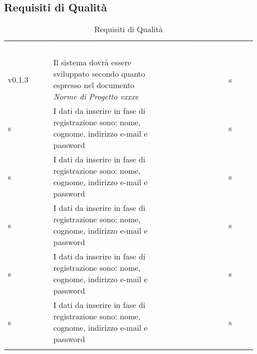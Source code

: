 \subsection{Requisiti di Qualità}


\renewcommand{\arraystretch}{1.5}
\begin{longtable}{ m{}<{\centering}  m{}<{\centering}  m{}<{\centering}  m{}<{\centering}}
	\rowcolor{darkblue}
	\textcolor{white}{\textbf{Requisito}} &\textcolor{white}{\textbf{Descrizione}}& \textcolor{white}{\textbf{Classificazione}} & \textcolor{white}{\textbf{Fonti}}\\ 

	 v0.1.3 & Il sistema dovrà essere sviluppato secondo quanto espresso nel documento \textit{Norme di Progetto vxxxe} & \Ob & s\\	

	\rowcolor{gray!25} s & I dati da inserire in fase di registrazione sono: nome, cognome, indirizzo e-mail e password & \Ob & s\\	
	 
	 s & I dati da inserire in fase di registrazione sono: nome, cognome, indirizzo e-mail e password & \Ob & s\\	

	\rowcolor{gray!25} s & I dati da inserire in fase di registrazione sono: nome, cognome, indirizzo e-mail e password & \Ob & s\\	
	 
	 s & I dati da inserire in fase di registrazione sono: nome, cognome, indirizzo e-mail e password & \Ob & s\\	
	 
	\rowcolor{gray!25} s & I dati da inserire in fase di registrazione sono: nome, cognome, indirizzo e-mail e password & \Ob & s\\			 

	\caption{Requisiti di Qualità}
\end{longtable}

\clearpage